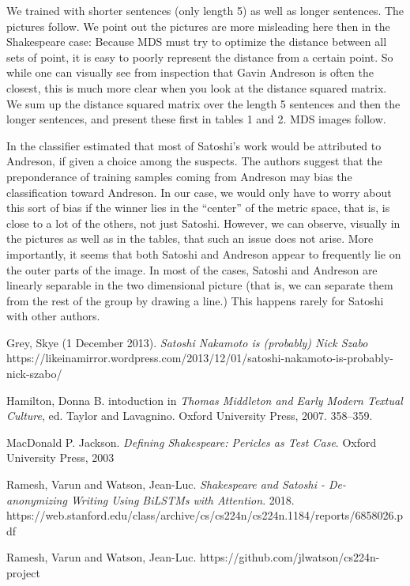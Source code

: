 \documentclass{article}%
\begin{document}
We trained with shorter sentences (only length 5) as well as longer sentences.  The pictures follow.  We point out the pictures are more misleading here then in the Shakespeare case:  Because MDS must try to optimize the distance between all sets of point, it is easy to poorly represent the distance from a certain point.  So while one can visually see from inspection that Gavin Andreson is often the closest, this is much more clear when you look at the distance squared matrix.   We sum up the distance squared matrix over the length 5 sentences and then the longer sentences, and present these first in tables 1 and 2.  MDS images follow.  

In \cite{RW} the classifier estimated that most of Satoshi's work would be attributed to Andreson, if given a choice among the suspects.   The authors suggest that the preponderance of training samples coming from Andreson may bias the classification toward Andreson.   In our case, we would only have to worry about this sort of bias if the winner lies in the ``center'' of the metric space, that is, is close to a lot of the others, not just Satoshi. However, we can observe, visually in the pictures as well as in the tables, that such an issue does not arise.  More importantly, it seems that both Satoshi and Andreson appear to frequently lie on the outer parts of the image.  In most of the cases, Satoshi and Andreson are linearly separable in the two dimensional picture (that is, we can separate them from the rest of the group by drawing a line.)  This happens rarely for Satoshi with other authors. 




\begin{thebibliography}{999}





  Grey, Skye (1 December 2013). \emph{Satoshi Nakamoto is (probably) Nick Szabo } 
https://likeinamirror.wordpress.com/2013/12/01/satoshi-nakamoto-is-probably-nick-szabo/

Hamilton, Donna B.  intoduction in
 \emph{Thomas Middleton and Early Modern Textual Culture}, ed. Taylor and Lavagnino. Oxford University Press, 2007.  358–359.
  
  MacDonald P. Jackson.
  \emph{Defining Shakespeare: Pericles as Test Case}.
   Oxford University Press, 2003

  Ramesh, Varun and Watson, Jean-Luc.
  \emph{Shakespeare and Satoshi - De-anonymizing Writing Using BiLSTMs with Attention}.
   2018.  
   https://web.stanford.edu/class/archive/cs/cs224n/cs224n.1184/reports/6858026.pdf
  

  Ramesh, Varun and Watson, Jean-Luc.   
https://github.com/jlwatson/cs224n-project


\end{thebibliography}
\end{document}
